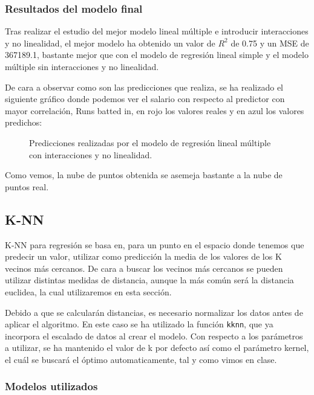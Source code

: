 \newpage

\subsubsection{Resultados del modelo final}

Tras realizar el estudio del mejor modelo lineal múltiple e introducir interacciones y no linealidad, el mejor modelo ha obtenido un valor de $R^2$ de 0.75 y un MSE de 367189.1, bastante mejor que con el modelo de regresión lineal simple y el modelo múltiple sin interacciones y no linealidad.

De cara a observar como son las predicciones que realiza, se ha realizado el siguiente gráfico donde podemos ver el salario con respecto al predictor con mayor correlación, Runs batted in, en rojo los valores reales y en azul los valores predichos:

\begin{figure}[H]
	\centering
	
	\caption{Predicciones realizadas por el modelo de regresión lineal múltiple con interacciones y no linealidad.}
	\label{fig:predicciones_lm_completo}
\end{figure}

Como vemos, la nube de puntos obtenida se asemeja bastante a la nube de puntos real.

\newpage

\subsection{K-NN}

K-NN para regresión se basa en, para un punto en el espacio donde tenemos que predecir un valor, utilizar como predicción la media de los valores de los K vecinos más cercanos. De cara a buscar los vecinos más cercanos se pueden utilizar distintas medidas de distancia, aunque la más común será la distancia euclidea, la cual utilizaremos en esta sección.

Debido a que se calcularán distancias, es necesario normalizar los datos antes de aplicar el algoritmo. En este caso se ha utilizado la función \texttt{kknn}, que ya incorpora el escalado de datos al crear el modelo. Con respecto a los parámetros a utilizar, se ha mantenido el valor de k por defecto así como el parámetro kernel, el cuál se buscará el óptimo automaticamente, tal y como vimos en clase.

\subsubsection{Modelos utilizados}

